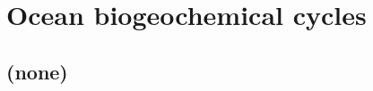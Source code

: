 
\cleardoublepage


\chapter{Ocean biogeochemical cycles}\label{ch:ocean=biogeochem}

\hfill \break

\newpage

\section{(none)}

